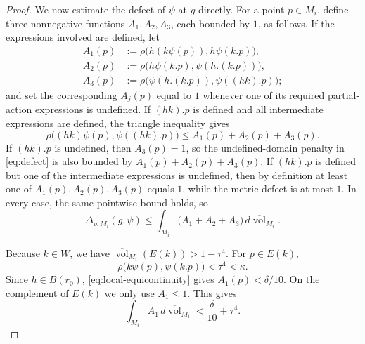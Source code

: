 \documentclass[12pt]{amsart}
\theoremstyle{definition}
\newcommand{\vol}{\operatorname{vol}}
\newcommand{\1}{\mathbf 1}
\newcommand{\dbar}{\overline{\vol}}
\begin{document}
\begin{proof}
We now estimate the defect of $\psi$ at $g$ directly. For a point $p\in M_i$, define three nonnegative functions $A_1,A_2,A_3$, each bounded by $1$, as follows. If the expressions involved are defined, let
\begin{align*}
 A_1(p)&:=\rho\bigl(h(k\psi(p)),h\psi(k.p)\bigr),\\
 A_2(p)&:=\rho\bigl(h\psi(k.p),\psi(h.(k.p))\bigr),\\
 A_3(p)&:=\rho\bigl(\psi(h.(k.p)),\psi((hk).p)\bigr);
\end{align*}
and set the corresponding $A_j(p)$ equal to $1$ whenever one of its required partial-action expressions is undefined. If $(hk).p$ is defined and all intermediate expressions are defined, the triangle inequality gives
\[
 \rho\bigl((hk)\psi(p),\psi((hk).p)\bigr)
 \leq A_1(p)+A_2(p)+A_3(p).
\]
If $(hk).p$ is undefined, then $A_3(p)=1$, so the undefined-domain penalty in \eqref{eq:defect} is also bounded by $A_1(p)+A_2(p)+A_3(p)$. If $(hk).p$ is defined but one of the intermediate expressions is undefined, then by definition at least one of $A_1(p),A_2(p),A_3(p)$ equals $1$, while the metric defect is at most $1$. In every case, the same pointwise bound holds, so
\begin{equation}\label{eq:defect-three-direct}
 \Delta_{\rho,M_i}(g,\psi)
 \leq \int_{M_i}\bigl(A_1+A_2+A_3\bigr)\,d\dbar_{M_i}.
\end{equation}

Because $k\in W$, we have $\dbar_{M_i}(E(k))>1-\tau^4$. For $p\in E(k)$,
\[
 \rho\bigl(k\psi(p),\psi(k.p)\bigr)<\tau^4<\kappa.
\]
Since $h\in B(r_0)$, \eqref{eq:local-equicontinuity} gives $A_1(p)<\delta/10$. On the complement of $E(k)$ we only use $A_1\leq1$. This gives
\begin{equation}\label{eq:A1-bound}
 \int_{M_i}A_1\,d\dbar_{M_i}
 <\frac\delta{10}+\tau^4.
\end{equation}


\end{proof}
\end{document}
